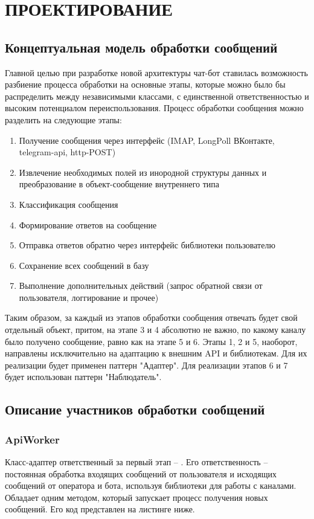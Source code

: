 \section{ПРОЕКТИРОВАНИЕ}
    \subsection{Концептуальная модель обработки сообщений}
    Главной целью при разработке новой архитектуры чат-бот ставилась возможность
    разбиение процесса обработки на основные этапы, которые можно было бы
    распределить между независимыми классами, с единственной ответственностью и
    высоким потенциалом переиспользования.
    Процесс обработки сообщения можно разделить на следующие этапы:
    \begin{enumerate}
        \item Получение сообщения через интерфейс (IMAP, LongPoll ВКонтакте, 
        telegram-api, http-POST)
        \item Извлечение необходимых полей из инородной структуры данных и 
        преобразование в объект-сообщение внутреннего типа
        \item Классификация сообщения
        \item Формирование ответов на сообщение
        \item Отправка ответов обратно через интерфейс библиотеки пользователю
        \item Сохранение всех сообщений в базу
        \item Выполнение дополнительных действий (запрос обратной связи от
        пользователя, логгирование и прочее)
    \end{enumerate}

    Таким образом, за каждый из этапов обработки сообщения отвечать будет свой 
    отдельный объект, притом, на этапе 3 и 4 абсолютно не важно, по какому 
    каналу было получено сообщение, равно как на этапе 5 и 6. Этапы 1, 2 и 5, 
    наоборот, направлены исключительно на адаптацию к внешним API и библиотекам.
    Для их реализации будет применен паттерн "Адаптер". Для реализации этапов
    6 и 7 будет использован паттерн "Наблюдатель".\cite{design.pattens}

    
    \subsection{Описание участников обработки сообщений}
    \subsubsection*{ApiWorker}
    Класс-адаптер ответственный за первый этап -- .
    Его ответственность -- постоянная обработка входящих сообщений от 
    пользователя и исходящих сообщений от оператора и бота, используя библиотеки
    для работы с каналами. Обладает одним методом, который запускает процесс 
    получения новых сообщений. Его код представлен на листинге ниже.

